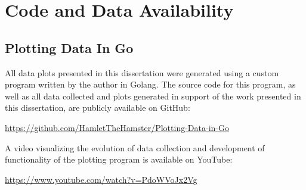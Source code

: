 \chapter{Code and Data Availability}
\label{appendix:CodeandDataAvailability}
\acresetall


%


\section{Plotting Data In Go}

All data plots presented in this dissertation were generated using a custom program written by the author in Golang. The source code for this program, as well as all data collected and plots generated in support of the work presented in this dissertation, are publicly available on GitHub:

\hfill

\begin{center}
  \url{https://github.com/HamletTheHamster/Plotting-Data-in-Go}
\end{center}

\hfill

A video visualizing the evolution of data collection and development of functionality of the plotting program is available on YouTube:

\hfill

\begin{center}
  \url{https://www.youtube.com/watch?v=PdoWVoJx2Vg}
\end{center}

%
